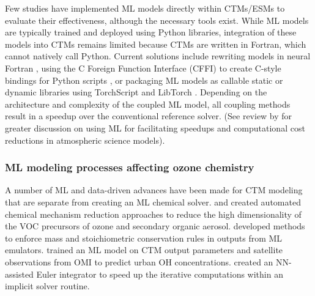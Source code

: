 \documentclass[gmd, manuscript]{copernicus}
\begin{document}
Few studies have implemented ML models directly within CTMs/ESMs to evaluate their effectiveness, although the necessary tools exist. While ML models are typically trained and deployed using Python libraries, integration of these models into CTMs remains limited because CTMs are written in Fortran, which cannot natively call Python. Current solutions include rewriting models in neural Fortran \citep{keller_application_2019}, using the C Foreign Function Interface (CFFI) to create C-style bindings for Python scripts \citep{kelp_online-learned_2022, zhong_wrfml_2023}, or packaging ML models as callable static or dynamic libraries using TorchScript and LibTorch \citep{xia_advancing_2024}. Depending on the architecture and complexity of the coupled ML model, all coupling methods result in a speedup over the conventional reference solver. (See review by \citet{de_burgh-day_machine_2023} for greater discussion on using ML for facilitating speedups and computational cost reductions in atmospheric science models). 

\subsubsection{ML modeling processes affecting ozone chemistry}
A number of ML and data-driven advances have been made for CTM modeling that are separate from creating an ML chemical solver. \citet{wiser_amore-isoprene_2023} and \citet{wang_implementation_2023} created automated chemical mechanism reduction approaches to reduce the high dimensionality of the VOC precursors of ozone and secondary organic aerosol. \citet{sturm_conservation_2022, sturm_mass-_2020} developed methods to enforce mass and stoichiometric conservation rules in outputs from ML emulators. \citet{zhu_combining_2022} trained an ML model on CTM output parameters and satellite observations from OMI to predict urban OH concentrations. \citet{huang_neural_2022} created an NN-assisted Euler integrator to speed up the iterative computations within an implicit solver routine. 
\end{document}
